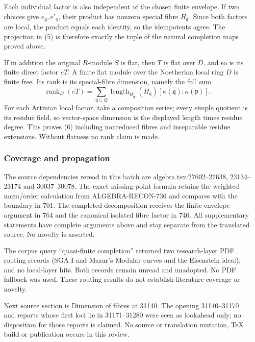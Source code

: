 Each individual factor is also independent of the chosen finite envelope. If two choices give \(e_{\mathfrak q},e'_{\mathfrak q}\), their product has nonzero special fibre \(H_{\bar{\mathfrak q}}\). Since both factors are local, the product equals each identity, so the idempotents agree. The projection in (5) is therefore exactly the tuple of the natural completion maps proved above.

If in addition the original \(R\)-module \(S\) is flat, then \(T\) is flat over \(D\), and so is its finite direct factor \(eT\). A finite flat module over the Noetherian local ring \(D\) is finite free. Its rank is its special-fibre dimension, namely the full sum \[
 \operatorname{rank}_D(eT)
 =
 \sum_{\mathfrak q\in Q}
   \operatorname{length}_{H_{\bar{\mathfrak q}}}
                         (H_{\bar{\mathfrak q}})
   [\kappa(\mathfrak q):\kappa(\mathfrak p)].
 \tag{6}
\] For each Artinian local factor, take a composition series; every simple quotient is its residue field, so vector-space dimension is the displayed length times residue degree. This proves (6) including nonreduced fibres and inseparable residue extensions. Without flatness no rank claim is made.

\subsubsection{Coverage and propagation}\label{algebra-proof-033-coverage-and-propagation}

The source dependencies reread in this batch are algebra.\AlgebraIdentifierBreak{}tex:\AlgebraIdentifierBreak{}27602--\AlgebraIdentifierBreak{}27638, 23134--23174 and 30037--30078. The exact missing-point formula retains the weighted norm/order calculation from ALGEBRA-\AlgebraIdentifierBreak{}RECON-\AlgebraIdentifierBreak{}736 and compares with the boundary in 701. The completed decomposition receives the finite-envelope argument in 764 and the canonical isolated fibre factor in 746. All supplementary statements have complete arguments above and stay separate from the translated source. No novelty is asserted.

The corpus query ``quasi-finite completion'' returned two research-layer PDF routing records (SGA I and Mazur's Modular curves and the Eisenstein ideal), and no local-layer hits. Both records remain unread and unadopted. No PDF fallback was used. These routing results do not establish literature coverage or novelty.

Next source section is Dimension of fibres at 31140. The opening 31140--31170 and reports whose first loci lie in 31171--31280 were seen as lookahead only; no disposition for those reports is claimed. No source or translation mutation, TeX build or publication occurs in this review.
